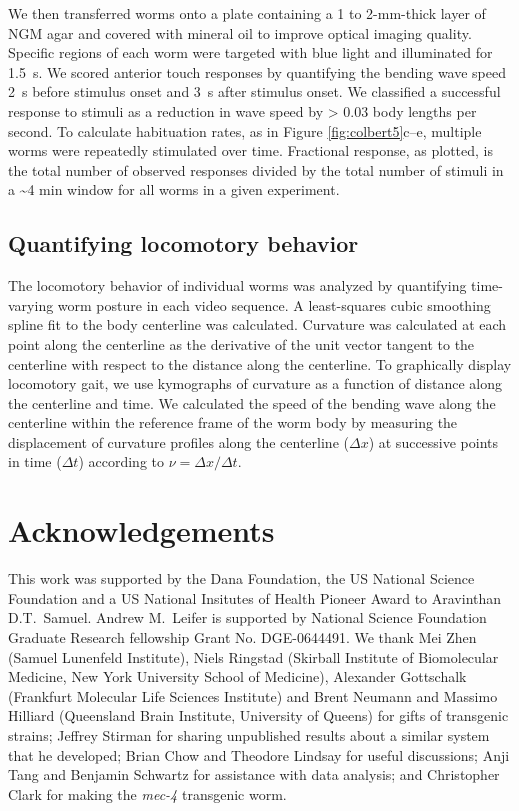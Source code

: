 We then transferred worms onto a plate containing a 1 to 2-mm-thick layer of NGM agar and covered with mineral oil to improve optical imaging quality. Specific regions of each worm were targeted with blue light and illuminated for 1.5~s. We scored anterior touch responses by quantifying the bending wave speed 2~s before stimulus onset and 3~s after stimulus onset. We classified a successful response to stimuli as a reduction in wave speed by > 0.03 body lengths per second. To calculate habituation rates, as in Figure \ref{fig:colbert5}c–e, multiple worms were repeatedly stimulated over time. Fractional response, as plotted, is the total number of observed responses divided by the total number of stimuli in a \textasciitilde 4 min window for all worms in a given experiment.

\subsection{Quantifying locomotory behavior}
The locomotory behavior of individual worms was analyzed by quantifying time-varying worm posture in each video sequence. A least-squares cubic smoothing spline fit to the body centerline was calculated. Curvature was calculated at each point along the centerline as the derivative of the unit vector tangent to the centerline with respect to the distance along the centerline. To graphically display locomotory gait, we use kymographs of curvature as a function of distance along the centerline and time. We calculated the speed of the bending wave along the centerline within the reference frame of the worm body by measuring the displacement of curvature profiles along the centerline ($\Delta x$) at successive points in time ($\Delta t$) according to $\nu = \Delta x / \Delta t$.

\section{Acknowledgements}
This work was supported by the Dana Foundation, the US National Science Foundation and a US National Insitutes of Health Pioneer Award to Aravinthan D.T.~Samuel. Andrew M.~Leifer is supported by National Science Foundation Graduate Research fellowship Grant No. DGE-0644491. We thank Mei Zhen (Samuel Lunenfeld Institute), Niels Ringstad (Skirball Institute of Biomolecular Medicine, New York University School of Medicine), Alexander Gottschalk (Frankfurt Molecular Life Sciences Institute) and Brent Neumann and Massimo Hilliard (Queensland Brain Institute, University of Queens) for gifts of transgenic strains; Jeffrey Stirman for sharing unpublished results about a similar system that he developed; Brian Chow and Theodore Lindsay for useful discussions; Anji Tang and Benjamin Schwartz for assistance with data analysis; and Christopher Clark for making the \textit{mec-4} transgenic worm.


